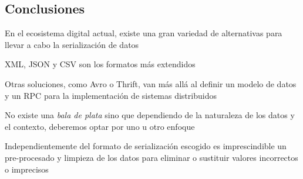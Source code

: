 \subsection{Conclusiones}
En el ecosistema digital actual, existe una gran variedad de alternativas para llevar a cabo la serialización de datos 

XML, JSON y CSV son los formatos más extendidos

Otras soluciones, como Avro o Thrift, van más allá al definir un modelo de datos y un RPC para la implementación de sistemas distribuidos

No existe una \textit{bala de plata} sino que dependiendo de la naturaleza de los datos y el contexto, deberemos optar por uno u otro enfoque

Independientemente del formato de serialización escogido es imprescindible un pre-procesado y limpieza de los datos para eliminar o sustituir valores incorrectos o imprecisos